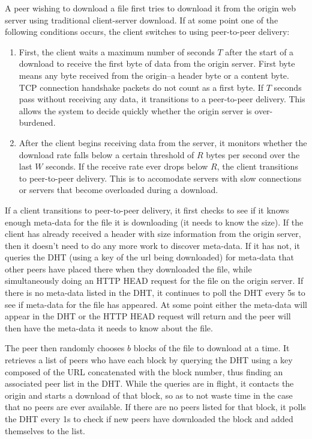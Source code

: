 A peer wishing to download a file first tries to download it from the origin web server using traditional client-server download.  If at some point one of the following conditions occurs, the client switches to using 
peer-to-peer delivery:
\begin{enumerate}
\item First, the client waits a maximum number of seconds $T$ after the start of a download to receive the first byte of data from the origin server.  
First byte means any byte received from the origin--a header byte or a content byte.  TCP connection handshake packets do not count as a first byte.
If $T$ seconds pass without receiving any data, it transitions to a peer-to-peer delivery.  This allows the system to decide quickly whether the origin server is over-burdened.   
\item After the client begins receiving data from the server, it monitors whether the download rate falls below a certain 
threshold of $R$ bytes per second over the last $W$ seconds.  If the receive rate ever drops below $R$, the client transitions to peer-to-peer delivery.  
This is to accomodate servers with slow connections or servers that become overloaded during a download.
\end{enumerate}

If a client transitions to peer-to-peer delivery, it first checks to see if it knows enough meta-data for the file it is downloading (it needs to know the size).
If the client has already received a header with size information from the origin server, then it doesn't need to do any more work to discover meta-data.  If it has not, it
queries the DHT (using a key of the url being downloaded) for meta-data that other peers have placed there when they downloaded the file, while simultaneously doing an HTTP HEAD 
request for the file on the origin server.  If there is no meta-data listed in the DHT, it continues to poll the DHT every 5s to see if meta-data for the file has appeared.  At some point
either the meta-data will appear in the DHT or the HTTP HEAD request will return and the peer will then have the meta-data it needs to know about the file.

The peer then randomly chooses $b$ blocks of the file to download at a time.  It retrieves a list of peers who have each block by querying the DHT using a key composed of
the URL concatenated with the block number, thus finding an associated peer list in the DHT.  While the queries are in flight, it contacts the origin and starts a download of that block, so as to 
not waste time in the case that no peers are ever available.
If there are no peers listed for that block, it polls the DHT every 1s to check if new peers have downloaded the block and added themselves to the list.

